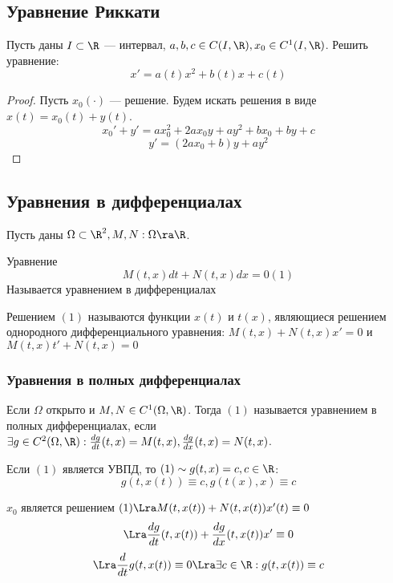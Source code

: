 \subsection{Уравнение Риккати}
\begin{problem}
    Пусть даны \(I \subset \R\) --- интервал, \(a, b, c \in C(I, \R), x_0 \in C^1(I, \R)\). Решить уравнение:
    \[x' = a(t)x^2 + b(t)x + c(t)\]
\end{problem}
\begin{proof}
    Пусть \(x_0(\cdot)\) --- решение. Будем искать решения в виде \(x(t) = x_0(t) + y(t)\). 
    \[x_0' + y' = ax_0^2 + 2ax_0y + ay^2 + bx_0 + by + c\]
    \[y' = (2ax_0 + b)y + ay^2\]
\end{proof}

\subsection{Уравнения в дифференциалах}
Пусть даны \(\Omega \subset \R^2, M, N: \Omega \ra \R\).

\begin{definition}
    Уравнение
    \[M(t, x)dt + N(t, x)dx = 0 (1)\]
    Называется уравнением в дифференциалах
\end{definition}

\begin{definition}
    Решением \((1)\) называются функции \(x(t)\) и \(t(x)\), являющиеся решением однородного дифференциального уравнения: \(M(t, x) + N(t, x)x' = 0\) и \(M(t, x)t' + N(t, x) = 0\)
\end{definition}

\subsubsection{Уравнения в полных дифференциалах}
\begin{definition}
    Если \(\Omega\) открыто и \(M, N \in C^1(\Omega, \R)\). Тогда \((1)\) называется уравнением в полных дифференциалах, если \(\exists g \in C^2(\Omega, \R): \frac{dg}{dt}(t, x) = M(t, x), \frac{dg}{dx}(t, x) = N(t, x)\).
\end{definition}

Если \((1)\) является УВПД, то \((1) \sim g(t, x) = c, c \in \R\):
\[g(t, x(t)) \equiv c, g(t(x), x) \equiv c\]

\(x_0\) является решением \((1) \Lra M(t, x(t)) + N(t, x(t))x'(t) \equiv 0\)
\[\Lra \frac{dg}{dt}(t, x(t)) + \frac{dg}{dx}(t, x(t))x' \equiv 0\]
\[\Lra \frac{d}{dt}g(t, x(t)) \equiv 0 \Lra \exists c \in \R: g(t, x(t)) \equiv c\]

